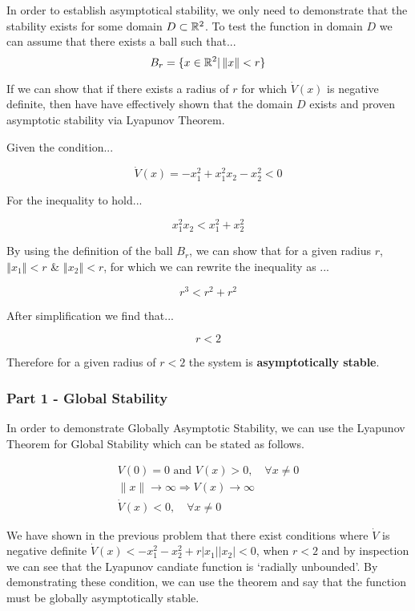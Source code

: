 \noindent In order to establish asymptotical stability, we only need to demonstrate that the stability exists for some domain $D \subset \mathbb{R}^2$. To test the function in domain $D$ we can assume that there exists a ball such that... \\

$$
B_r = \{ x \in \mathbb{R}^2 | \left\Vert x \right\Vert < r\}
$$

\noindent If we can show that if there exists a radius of $r$ for which $\dot{V}(x)$ is negative definite, then have have effectively shown that the domain $D$ exists and proven asymptotic stability via Lyapunov Theorem.

\indent Given the condition...

$$
\dot{V}(x)=-x_{1}^{2}+x_{1}^{2} x_{2}-x_{2}^{2} < 0
$$

\noindent For the inequality to hold...

$$
x_{1}^{2} x_{2} < x_{1}^{2} + x_{2}^{2}
$$

\noindent By using the definition of the ball $B_r$, we can show that for a given radius $r$, $\left\Vert x_1 \right\Vert < r$ \& $\left\Vert x_2 \right\Vert < r$, for which we can rewrite the inequality as ...

$$
r^3 < r^2 + r^2
$$

\noindent After simplification we find that...

$$
r < 2
$$

\noindent Therefore for a given radius of $r < 2$ the system is \textbf{asymptotically stable}.


\subsubsection*{Part 1 - Global Stability}

\noindent In order to demonstrate Globally Asymptotic Stability, we can use the Lyapunov Theorem for Global Stability which can be stated as follows.

\begin{equation}
\begin{array}{c}
V(0)=0 \text { and } V(x)>0, \quad \forall x \neq 0 \\
\|x\| \rightarrow \infty \Rightarrow V(x) \rightarrow \infty \\
\dot{V}(x)<0, \quad \forall x \neq 0
\end{array}
\end{equation}

\noindent We have shown in the previous problem that there exist conditions where $\dot{V}$ is negative definite $\dot{V}(x) < -x_{1}^2 - x_{2}^2 + r|x_1||x_2| < 0$, when $r<2$ and by inspection we can see that the Lyapunov candiate function is `radially unbounded'. By demonstrating these condition, we can use the theorem and say that the function must be globally asymptotically stable.

